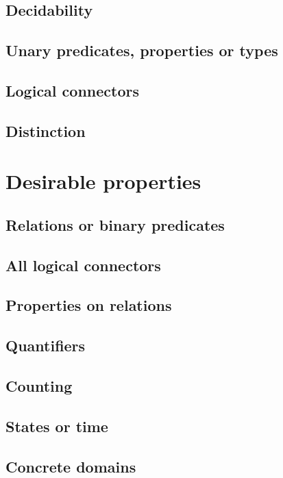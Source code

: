 \subsection{Decidability}

\subsection{Unary predicates, properties or types}

\subsection{Logical connectors}

\subsection{Distinction}


\section{Desirable properties}

\subsection{Relations or binary predicates}

\subsection{All logical connectors}

\subsection{Properties on relations}

\subsection{Quantifiers}

\subsection{Counting}

\subsection{States or time}

\subsection{Concrete domains}

